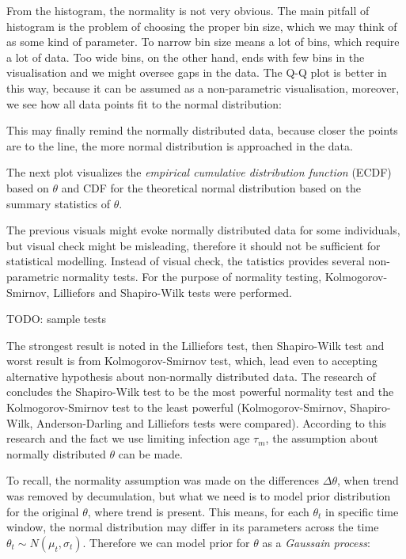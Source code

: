 \documentclass[
  digital, %
  table,   %
  twoside, %
  12pt,
  lof,     %
  lot,     %
]{fithesis3}
\begin{document}
From the histogram, the normality is not 
very obvious. 
The main pitfall of histogram is the problem 
of choosing the proper bin size, which we may 
think of as some kind of parameter. 
To narrow bin size means a lot of bins, which 
require a lot of data. 
Too wide bins, on the other hand, ends with 
few bins in the visualisation and we might 
oversee gaps in the data. 
The Q-Q plot is better in this way, because 
it can be assumed as a non-parametric 
visualisation, moreover, we see how all data 
points fit to the normal distribution:

This may finally remind the normally distributed 
data, because closer the points are to the line, 
the more normal distribution is approached in 
the data.

The next plot visualizes the 
\textit{empirical cumulative distribution function}
(ECDF) based on $\theta$ and CDF for the 
theoretical normal distribution based on 
the summary statistics of $\theta$.

The previous visuals might evoke normally 
distributed data for some individuals, but 
visual check might be misleading, therefore 
it should not be sufficient for statistical 
modelling. Instead of visual check, the 
tatistics provides several non-parametric 
normality tests. For the purpose of normality 
testing, Kolmogorov-Smirnov, Lilliefors and 
Shapiro-Wilk tests were performed.

TODO: sample tests



The strongest result is noted in the 
Lilliefors test, then Shapiro-Wilk test and 
worst result is from Kolmogorov-Smirnov test, 
which, lead even to accepting alternative 
hypothesis about non-normally distributed data. 
The research of \cite{razali2011} concludes the 
Shapiro-Wilk test to be the most powerful 
normality test and the Kolmogorov-Smirnov test 
to the least powerful (Kolmogorov-Smirnov, 
Shapiro-Wilk, Anderson-Darling and Lilliefors 
tests were compared). 
According to this research and the fact we 
use limiting infection age $\tau_m$, the 
assumption about normally distributed $\theta$ 
can be made.

To recall, the normality assumption was made 
on the differences $\Delta \theta$, when trend 
was removed by decumulation, but what we need 
is to model prior distribution for the original 
$\theta$, where trend is present. 
This means, for each $\theta_t$ in specific 
time window, the normal distribution may differ 
in its parameters across the time 
$\theta_t \sim N(\mu_t, \sigma_t)$. 
Therefore we can model prior for $\theta$ as a 
\textit{Gaussain process}:
\end{document}
